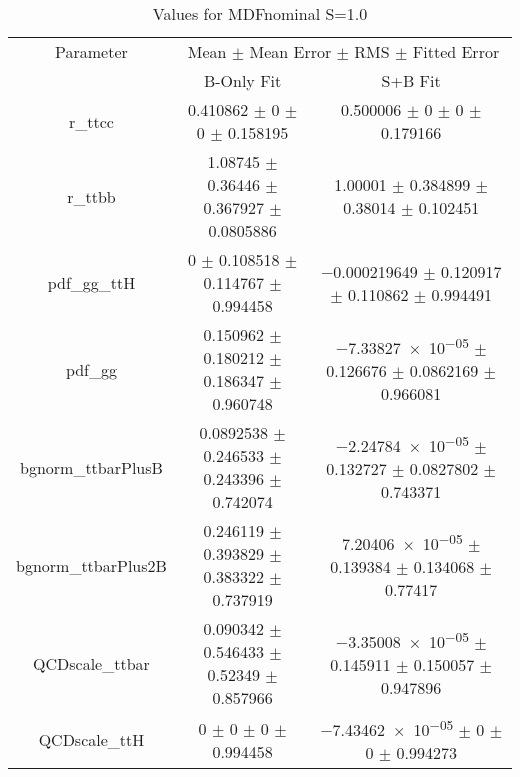 \begin{table}
\centering
\caption{Values for MDFnominal S=1.0}
\begin{tabular}{ccc}
\toprule
Parameter & \multicolumn{2}{c}{Mean $\pm$ Mean Error $\pm$ RMS $\pm$ Fitted Error}\\
 & B-Only Fit & S+B Fit\\
\midrule
r\_ttcc & \num{0.410862} $\pm$ \num{0} $\pm$ \num{0} $\pm$ \num{0.158195} & \num{0.500006} $\pm$ \num{0} $\pm$ \num{0} $\pm$ \num{0.179166}\\
r\_ttbb & \num{1.08745} $\pm$ \num{0.36446} $\pm$ \num{0.367927} $\pm$ \num{0.0805886} & \num{1.00001} $\pm$ \num{0.384899} $\pm$ \num{0.38014} $\pm$ \num{0.102451}\\
pdf\_gg\_ttH & \num{0} $\pm$ \num{0.108518} $\pm$ \num{0.114767} $\pm$ \num{0.994458} & \num{-0.000219649} $\pm$ \num{0.120917} $\pm$ \num{0.110862} $\pm$ \num{0.994491}\\
pdf\_gg & \num{0.150962} $\pm$ \num{0.180212} $\pm$ \num{0.186347} $\pm$ \num{0.960748} & \num{-7.33827e-05} $\pm$ \num{0.126676} $\pm$ \num{0.0862169} $\pm$ \num{0.966081}\\
bgnorm\_ttbarPlusB & \num{0.0892538} $\pm$ \num{0.246533} $\pm$ \num{0.243396} $\pm$ \num{0.742074} & \num{-2.24784e-05} $\pm$ \num{0.132727} $\pm$ \num{0.0827802} $\pm$ \num{0.743371}\\
bgnorm\_ttbarPlus2B & \num{0.246119} $\pm$ \num{0.393829} $\pm$ \num{0.383322} $\pm$ \num{0.737919} & \num{7.20406e-05} $\pm$ \num{0.139384} $\pm$ \num{0.134068} $\pm$ \num{0.77417}\\
QCDscale\_ttbar & \num{0.090342} $\pm$ \num{0.546433} $\pm$ \num{0.52349} $\pm$ \num{0.857966} & \num{-3.35008e-05} $\pm$ \num{0.145911} $\pm$ \num{0.150057} $\pm$ \num{0.947896}\\
QCDscale\_ttH & \num{0} $\pm$ \num{0} $\pm$ \num{0} $\pm$ \num{0.994458} & \num{-7.43462e-05} $\pm$ \num{0} $\pm$ \num{0} $\pm$ \num{0.994273}\\
\bottomrule
\end{tabular}
\end{table}
